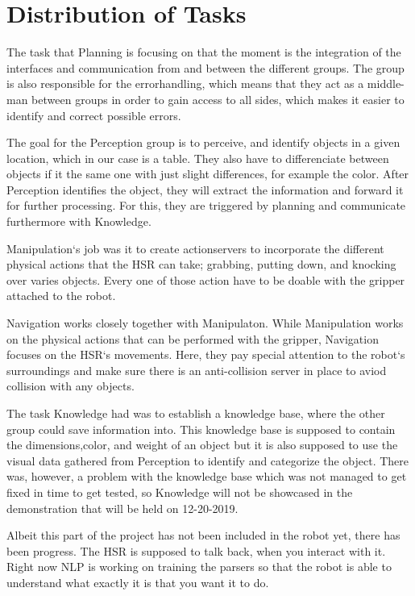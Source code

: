 \documentclass[main.tex]{subfiles}
\begin{document}
	
	\chapter{Distribution of Tasks}
		
	The task that Planning is focusing on that the moment is the integration of the interfaces and communication from and  between the different groups. The group is also responsible for the errorhandling, which means that they act as a middle-man between groups in order to gain access to all sides, which makes it easier to identify and correct possible errors. 

The goal for the Perception group is to perceive, and identify objects in a given location, which in our case is a table. They also have to differenciate between objects if it the same one with just slight differences, for example the color. After Perception identifies the object, they  will extract the information and forward it for further processing. For this, they are triggered by planning and communicate furthermore with Knowledge.

Manipulation‘s job was it to create actionservers to incorporate the different physical actions that the HSR can take; grabbing, putting down, and knocking over varies objects. Every one of those action have to be doable with the gripper attached to the robot. 

Navigation works closely together with Manipulaton. While Manipulation works on the physical actions that can be performed with the gripper, Navigation focuses on the HSR‘s movements. Here, they pay special attention to the robot‘s surroundings and make sure there is an anti-collision server in place to aviod collision with any objects. 

The task Knowledge had was to establish a knowledge base, where the other group could save information into. This knowledge base is supposed to contain the dimensions,color, and weight of an object but it is also supposed to use the visual data gathered from Perception to identify and categorize the object.
There was, however, a problem with the knowledge base which was not managed to get fixed in time to get tested, so Knowledge will not be showcased in the demonstration that will be held on 12-20-2019.

Albeit this part of the project has not been included in the robot yet, there has been progress. The HSR is supposed to talk back, when you interact with it. Right now NLP is working on training the parsers so that the robot is able to understand what exactly it is that you want it to do. 
\end{document}

